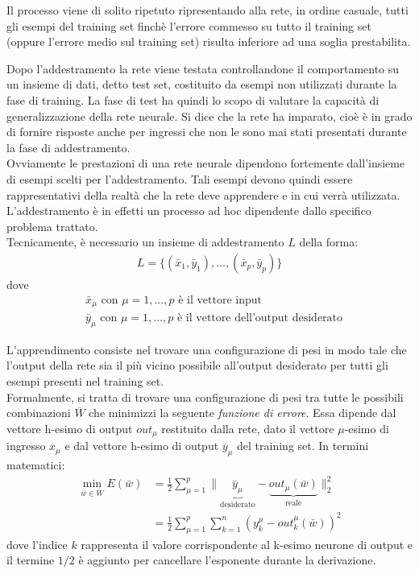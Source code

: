 Il processo viene di solito ripetuto ripresentando alla rete, in ordine casuale, tutti gli esempi del training set finchè l’errore commesso su tutto il training set (oppure l’errore medio sul training set) risulta inferiore ad una soglia prestabilita.

\newpage

Dopo l’addestramento la rete viene testata controllandone il comportamento su un insieme di dati, detto test set, costituito da esempi non utilizzati durante la fase di training. La fase di test ha quindi lo scopo di valutare la capacità di generalizzazione della rete neurale.
Si dice che la rete ha imparato, cioè è in grado di fornire risposte anche per ingressi che non le sono mai stati presentati durante la fase di addestramento.\\

Ovviamente le prestazioni di una rete neurale dipendono fortemente dall’insieme di esempi scelti per l’addestramento. Tali esempi devono quindi essere rappresentativi della realtà che la rete deve apprendere e in cui verrà utilizzata. L’addestramento è in effetti un processo ad hoc dipendente dallo specifico problema trattato.\\

Tecnicamente, è necessario un insieme di addestramento $L$ della forma: 
\begin{align}
    L = \{(\bar{x}_1, \bar{y}_1), \dots, (\bar{x}_p, \bar{y}_p) \}
\end{align}
dove
\begin{align*}
    &\bar{x}_\mu \mbox{ con $\mu=1, \dots, p$ è il vettore input} \\
    &\bar{y}_\mu \mbox{ con $\mu=1, \dots, p$ è il vettore dell'output desiderato}
\end{align*}

L'apprendimento consiste nel trovare una configurazione di pesi in modo tale che l'output della rete sia il più vicino possibile all'output desiderato per tutti gli esempi presenti nel training set.\\

Formalmente, si tratta di trovare una configurazione di pesi tra tutte le possibili combinazioni $\overline{W}$ che minimizzi la seguente \emph{funzione di errore}. Essa dipende dal vettore h-esimo di output $out_\mu$ restituito dalla rete, dato il vettore $\mu$-esimo di ingresso $\overline{x}_\mu$ e dal vettore h-esimo di output $\overline{y}_\mu$ del training set. In termini matematici:
\begin{align*}
    \min_{\bar{w} \in \overline{W}} E(\bar{w}) &= \frac{1}{2} \sum_{\mu=1}^p \| \underbrace{\bar{y}_\mu}_\textrm{desiderato} - \underbrace{out_\mu (\bar{w})}_\textrm{reale} \|_2^2 \\
    &= \frac{1}{2} \sum_{\mu=1}^p \sum_{k=1}^n \left(y_k^\mu - out_k^\mu (\bar{w})\right)^2
\end{align*}
dove l'indice $k$ rappresenta il valore corrispondente al k-esimo neurone di output e il termine $1/2$ è aggiunto per cancellare l'esponente durante la derivazione.

